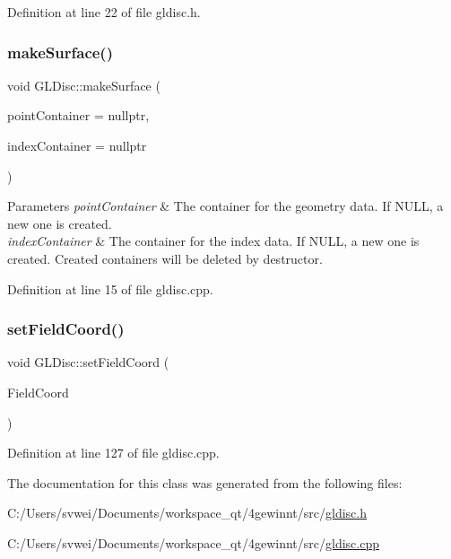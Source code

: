 Definition at line 22 of file gldisc.\+h.

\mbox{\label{class_g_l_disc_a5b74533be5d65c44f7f5493163b94eb4}} 
\subsubsection{\texorpdfstring{makeSurface()}{makeSurface()}}
{\footnotesize\ttfamily void G\+L\+Disc\+::make\+Surface (\begin{DoxyParamCaption}\item[{Q\+Vector$<$ \mbox{\hyperlink{class_g_l_point}{G\+L\+Point}} $>$ $\ast$}]{point\+Container = {\ttfamily nullptr},  }\item[{Q\+Vector$<$ G\+Lushort $>$ $\ast$}]{index\+Container = {\ttfamily nullptr} }\end{DoxyParamCaption})}


\begin{DoxyParams}{Parameters}
{\em point\+Container} & The container for the geometry data. If N\+U\+LL, a new one is created. \\
\hline
{\em index\+Container} & The container for the index data. If N\+U\+LL, a new one is created. Created containers will be deleted by destructor. \\
\hline
\end{DoxyParams}


Definition at line 15 of file gldisc.\+cpp.

\mbox{\label{class_g_l_disc_a5f73b9821e996ecdc909a743b79925dd}} 
\subsubsection{\texorpdfstring{setFieldCoord()}{setFieldCoord()}}
{\footnotesize\ttfamily void G\+L\+Disc\+::set\+Field\+Coord (\begin{DoxyParamCaption}\item[{const Q\+Point \&}]{Field\+Coord }\end{DoxyParamCaption})}



Definition at line 127 of file gldisc.\+cpp.



The documentation for this class was generated from the following files\+:\begin{DoxyCompactItemize}
\item 
C\+:/\+Users/svwei/\+Documents/workspace\+\_\+qt/4gewinnt/src/\mbox{\hyperlink{gldisc_8h}{gldisc.\+h}}\item 
C\+:/\+Users/svwei/\+Documents/workspace\+\_\+qt/4gewinnt/src/\mbox{\hyperlink{gldisc_8cpp}{gldisc.\+cpp}}\end{DoxyCompactItemize}
